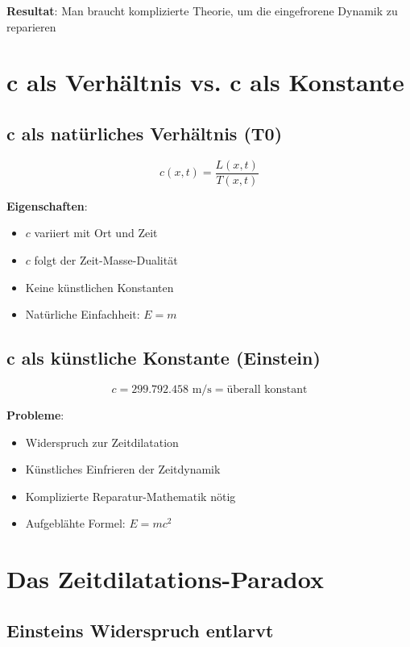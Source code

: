 \documentclass[12pt,a4paper]{article}
\begin{document}
	\textbf{Resultat}: Man braucht komplizierte Theorie, um die eingefrorene Dynamik zu reparieren
	
	\section{c als Verhältnis vs. c als Konstante}
	
	\subsection{c als natürliches Verhältnis (T0)}
	
	\begin{equation}
		c(x,t) = \frac{L(x,t)}{T(x,t)}
	\end{equation}
	
	\textbf{Eigenschaften}:
	\begin{itemize}
		\item $c$ variiert mit Ort und Zeit
		\item $c$ folgt der Zeit-Masse-Dualität
		\item Keine künstlichen Konstanten
		\item Natürliche Einfachheit: $E = m$
	\end{itemize}
	
	\subsection{c als künstliche Konstante (Einstein)}
	
	\begin{equation}
		c = 299.792.458 \text{ m/s} = \text{überall konstant}
	\end{equation}
	
	\textbf{Probleme}:
	\begin{itemize}
		\item Widerspruch zur Zeitdilatation
		\item Künstliches Einfrieren der Zeitdynamik
		\item Komplizierte Reparatur-Mathematik nötig
		\item Aufgeblähte Formel: $E = mc^2$
	\end{itemize}
	
	\section{Das Zeitdilatations-Paradox}
	
	\subsection{Einsteins Widerspruch entlarvt}
	
\end{document}
